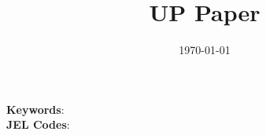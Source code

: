 \title{UP Paper}



\date{\today}
\maketitle

\begin{abstract}


\end{abstract}

\noindent\textbf{Keywords}:    \\
\textbf{JEL Codes}: 
\newpage